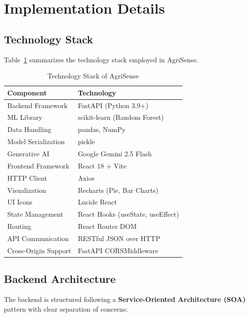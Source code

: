 
\section{Implementation Details}
\label{sec:implementation}

\subsection{Technology Stack}
Table~\ref{tab:tech_stack} summarizes the technology stack employed in AgriSense.

\begin{table}[htbp]
\caption{Technology Stack of AgriSense}
\label{tab:tech_stack}
\centering
\begin{tabular}{@{}ll@{}}
\toprule
\textbf{Component} & \textbf{Technology} \\
\midrule
Backend Framework & FastAPI (Python 3.9+) \\
ML Library & scikit-learn (Random Forest) \\
Data Handling & pandas, NumPy \\
Model Serialization & pickle \\
Generative AI & Google Gemini 2.5 Flash \\
Frontend Framework & React 18 + Vite \\
HTTP Client & Axios \\
Visualization & Recharts (Pie, Bar Charts) \\
UI Icons & Lucide React \\
State Management & React Hooks (useState, useEffect) \\
Routing & React Router DOM \\
API Communication & RESTful JSON over HTTP \\
Cross-Origin Support & FastAPI CORSMiddleware \\
\bottomrule
\end{tabular}
\end{table}

\subsection{Backend Architecture}
The backend is structured following a \textbf{Service-Oriented Architecture (SOA)} pattern with clear separation of concerns:

